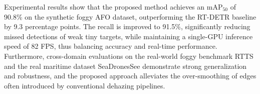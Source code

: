 {Experimental results show that the proposed method achieves an mAP$_{50}$ of 90.8\% on the synthetic foggy AFO dataset, outperforming the RT-DETR baseline by 9.3 percentage points. The recall is improved to 91.5\%, significantly reducing missed detections of weak tiny targets, while maintaining a single-GPU inference speed of 82 FPS, thus balancing accuracy and real-time performance. Furthermore, cross-domain evaluations on the real-world foggy benchmark RTTS and the real maritime dataset SeaDronesSee demonstrate strong generalization and robustness, and the proposed approach alleviates the over-smoothing of edges often introduced by conventional dehazing pipelines.
}

